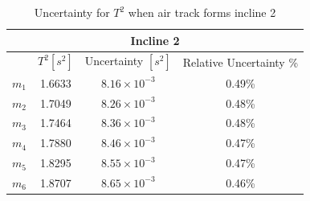\documentclass[12pt]{article}
\begin{document}
\begin{table}[H]
\centering
\begin{tabular}{|c|c|c|c|}
\hline
\multicolumn{4}{|c|}{Incline 2}                \\ \hline
  & $T^2[s^2]$      & Uncertainty $[s^2]$ & Relative Uncertainty \% \\ \hline
$m_1$ & 1.6633 		  & $8.16\times10^{-3}$        & 0.49\%                \\ \hline
$m_2$  & 1.7049       & $8.26\times10^{-3}$            &   0.48\%                \\ \hline
$m_3$  & 1.7464       & $8.36\times10^{-3}$            &  0.48\%                    \\ \hline
$m_4$  & 1.7880       & $8.46\times10^{-3}$            &  0.47\%                    \\ \hline
$m_5$  & 1.8295       & $8.55\times10^{-3}$            &  0.47\%                    \\ \hline
$m_6$  & 1.8707       & $8.65\times10^{-3}$            &  0.46\%                      \\ \hline
\end{tabular}
\caption{Uncertainty for $T^2$ when air track forms incline 2}
\end{table}
\end{document}
